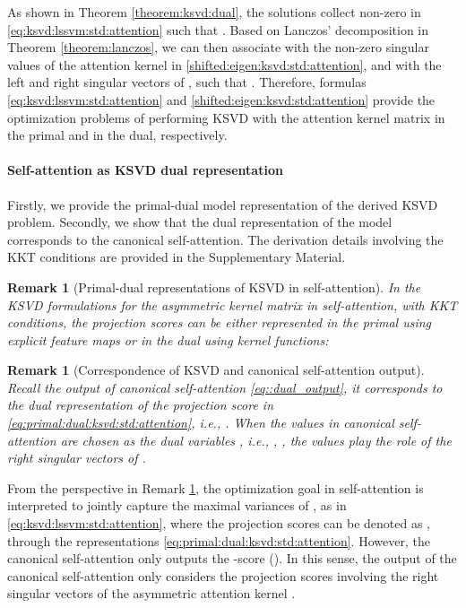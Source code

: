 \documentclass{article}
\newtheorem{remark}[theorem]{Remark}
\begin{document}
As shown in Theorem \ref{theorem:ksvd:dual}, the solutions collect non-zero  in \eqref{eq:ksvd:lssvm:std:attention} such that . 
Based on Lanczos' decomposition in Theorem \ref{theorem:lanczos}, we can then associate  with the non-zero singular values of the attention kernel  in \eqref{shifted:eigen:ksvd:std:attention}, and   with the left and right singular vectors of , such that . 
Therefore, formulas \eqref{eq:ksvd:lssvm:std:attention} and \eqref{shifted:eigen:ksvd:std:attention} provide the optimization problems of performing KSVD with the attention kernel matrix  in the primal and in the dual, respectively.




\paragraph{Self-attention as KSVD dual representation}
Firstly, we provide the primal-dual model representation of the derived KSVD  problem.
Secondly, we show that the dual representation of the model corresponds to the canonical self-attention.
The derivation details involving the KKT conditions are provided in the Supplementary Material.


\begin{remark}[Primal-dual representations of KSVD in self-attention] \label{rmk:primal:dual}
	In the KSVD formulations for the asymmetric kernel matrix in self-attention, with KKT conditions, the projection scores can be either represented in the primal using explicit feature maps or in the dual using  kernel functions:
	
\end{remark}

\begin{remark} [Correspondence of  KSVD and  canonical self-attention output] \label{rmk:e:score:self:attention}
	Recall the output  of canonical self-attention \eqref{eq::dual_output}, 
	it corresponds to the dual representation of the projection score  in  \eqref{eq:primal:dual:ksvd:std:attention}, i.e., .
	When the values {} in canonical self-attention are chosen as the dual variables {}, i.e., {, }, the values {} play the role of the right singular vectors of .
\end{remark}


From the perspective in Remark \ref{rmk:e:score:self:attention}, the  
{optimization goal} in self-attention is interpreted to jointly capture the maximal variances of ,  as in \eqref{eq:ksvd:lssvm:std:attention}, {where the projection scores can be denoted as ,  through the representations  \eqref{eq:primal:dual:ksvd:std:attention}.} 
{However,} the canonical self-attention only outputs the -score (). 
In this sense, the output of the canonical self-attention only considers the {projection scores} involving the right singular vectors of the asymmetric attention kernel .
\end{document}

